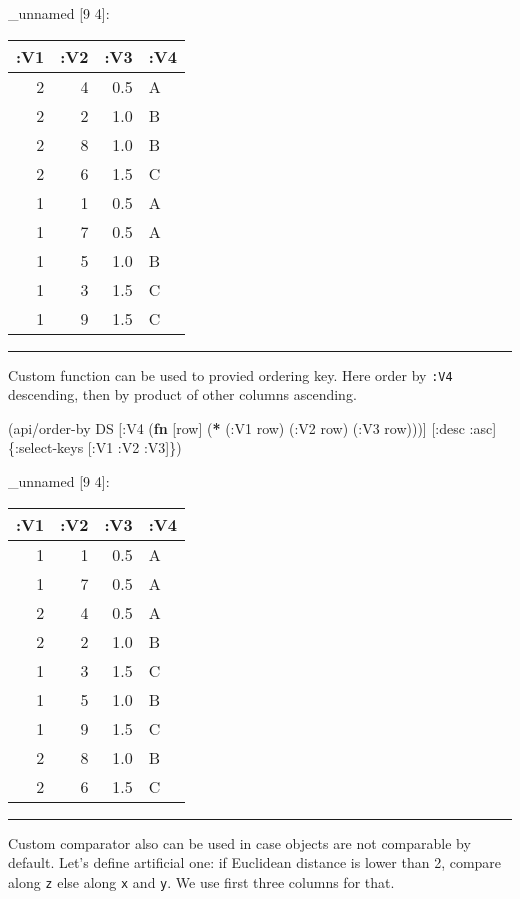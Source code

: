 \documentclass[]{article}
\newenvironment{Shaded}{\begin{snugshade}}{\end{snugshade}}
\newcommand{\KeywordTok}[1]{\textcolor[rgb]{0.13,0.29,0.53}{\textbf{#1}}}
\newcommand{\AttributeTok}[1]{\textcolor[rgb]{0.77,0.63,0.00}{#1}}
\newcommand{\NormalTok}[1]{#1}
\begin{document}
\_unnamed {[}9 4{]}:

\begin{longtable}[]{@{}rrrl@{}}
\toprule
:V1 & :V2 & :V3 & :V4\tabularnewline
\midrule
\endhead
2 & 4 & 0.5 & A\tabularnewline
2 & 2 & 1.0 & B\tabularnewline
2 & 8 & 1.0 & B\tabularnewline
2 & 6 & 1.5 & C\tabularnewline
1 & 1 & 0.5 & A\tabularnewline
1 & 7 & 0.5 & A\tabularnewline
1 & 5 & 1.0 & B\tabularnewline
1 & 3 & 1.5 & C\tabularnewline
1 & 9 & 1.5 & C\tabularnewline
\bottomrule
\end{longtable}

\begin{center}\rule{0.5\linewidth}{0.5pt}\end{center}

Custom function can be used to provied ordering key. Here order by
\texttt{:V4} descending, then by product of other columns ascending.

\begin{Shaded}
\begin{Highlighting}[]
\NormalTok{(api/order-by DS [}\AttributeTok{:V4}\NormalTok{ (}\KeywordTok{fn}\NormalTok{ [row] (}\KeywordTok{*}\NormalTok{ (}\AttributeTok{:V1}\NormalTok{ row)}
\NormalTok{                                  (}\AttributeTok{:V2}\NormalTok{ row)}
\NormalTok{                                  (}\AttributeTok{:V3}\NormalTok{ row)))] [}\AttributeTok{:desc} \AttributeTok{:asc}\NormalTok{] \{}\AttributeTok{:select-keys}\NormalTok{ [}\AttributeTok{:V1} \AttributeTok{:V2} \AttributeTok{:V3}\NormalTok{]\})}
\end{Highlighting}
\end{Shaded}

\_unnamed {[}9 4{]}:

\begin{longtable}[]{@{}rrrl@{}}
\toprule
:V1 & :V2 & :V3 & :V4\tabularnewline
\midrule
\endhead
1 & 1 & 0.5 & A\tabularnewline
1 & 7 & 0.5 & A\tabularnewline
2 & 4 & 0.5 & A\tabularnewline
2 & 2 & 1.0 & B\tabularnewline
1 & 3 & 1.5 & C\tabularnewline
1 & 5 & 1.0 & B\tabularnewline
1 & 9 & 1.5 & C\tabularnewline
2 & 8 & 1.0 & B\tabularnewline
2 & 6 & 1.5 & C\tabularnewline
\bottomrule
\end{longtable}

\begin{center}\rule{0.5\linewidth}{0.5pt}\end{center}

Custom comparator also can be used in case objects are not comparable by
default. Let's define artificial one: if Euclidean distance is lower
than 2, compare along \texttt{z} else along \texttt{x} and \texttt{y}.
We use first three columns for that.
\end{document}
